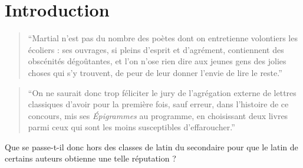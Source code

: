 \chapter*{Introduction}
\label{intro}



\begin{quote}{\textcite{boissier_poete_1900}}
    \enquote{Martial n’est pas du nombre des poètes dont on entretienne volontiers les écoliers : ses ouvrages, si pleins d’esprit et d’agrément, contiennent des obscénités dégoûtantes, et l’on n’ose rien dire aux jeunes gens des jolies choses qui s’y trouvent, de peur de leur donner l’envie de lire le reste.}
\end{quote}

\begin{quote}{\textcite{wolff_realisme_1997}}
    \enquote{On ne saurait donc trop féliciter le jury de l'agrégation externe de lettres classiques d'avoir pour la première fois, sauf erreur, dans l'histoire de ce concours, mis ses \textit{Épigrammes} au programme, en choisissant deux livres parmi ceux qui sont les moins susceptibles d'effaroucher.}
\end{quote}

Que se passe-t-il donc hors des classes de latin du secondaire pour que le latin de certains auteurs obtienne une telle réputation ?





% 


